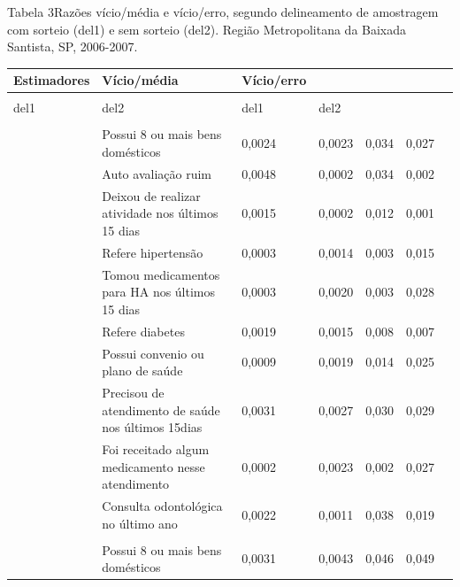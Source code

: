 \documentclass{article}
\begin{document}
Tabela 3Razões vício/média e vício/erro, segundo delineamento de amostragem com
sorteio (del1) e sem sorteio (del2). Região Metropolitana da Baixada Santista,
SP, 2006-2007.
\begin{table}
\begin{xtabular}{ l | l | l l | l | l | l }
\hline
Estimadores & Vício/média & Vício/erro\\ \hline
\\ \hline
del1 & del2 & del1 & del2\\ \hline
{}
&
&
&
\\ \hline

& Possui 8 ou mais bens domésticos
& 0,0024
& 0,0023
& 0,034
& 0,027
\\ \hline

& Auto avaliação ruim
& 0,0048
& 0,0002
& 0,034
& 0,002
\\ \hline

& Deixou de realizar atividade nos últimos 15 dias
& 0,0015
& 0,0002
& 0,012
& 0,001
\\ \hline

& Refere hipertensão
& 0,0003
& 0,0014
& 0,003
& 0,015
\\ \hline

& Tomou medicamentos para HA nos últimos 15 dias
& 0,0003
& 0,0020
& 0,003
& 0,028
\\ \hline

& Refere diabetes
& 0,0019
& 0,0015
& 0,008
& 0,007
\\ \hline

& Possui convenio ou plano de saúde
& 0,0009
& 0,0019
& 0,014
& 0,025
\\ \hline

& Precisou de atendimento de saúde nos últimos 15dias
& 0,0031
& 0,0027
& 0,030
& 0,029
\\ \hline

& Foi receitado algum medicamento nesse atendimento
& 0,0002
& 0,0023
& 0,002
& 0,027
\\ \hline

& Consulta odontológica no último ano
& 0,0022
& 0,0011
& 0,038
& 0,019
\\ \hline

&
&
&
\\ \hline

& Possui 8 ou mais bens domésticos
& 0,0031
& 0,0043
& 0,046
& 0,049
\\ \hline


\end{xtabular}
\end{table}
\end{document}
